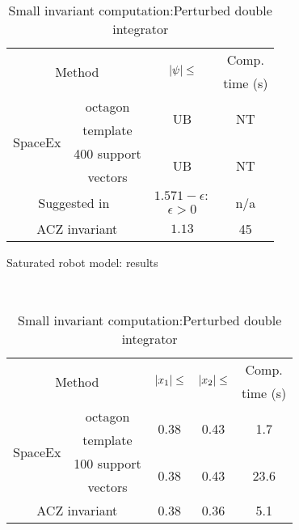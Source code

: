 {\begin{table}
\begin{minipage}{0.48\textwidth}
\begin{tabular}{|l|c|c|c|}
\hline
\multicolumn{2}{|c|}{\multirow{2}{*}{Method}} &
\multirow{2}{*}{$\left|\psi\right|\leq$} & Comp.\\
\multicolumn{2}{|c|}{} & & time (s)\\
\hline
\multirow{4}{*}{SpaceEx} & octagon & \multirow{2}{*}{UB} &
\multirow{2}{*}{NT}\\
& template & & \\
\cline{2-4}
& 400 support & \multirow{2}{*}{UB} & \multirow{2}{*}{NT}\\
& vectors & & \\
\hline
\multicolumn{2}{|c|}{\multirow{2}{*}{Suggested in~\cite{heinz2014benchmark}}} &
$1.571-\epsilon:$ & \multirow{2}{*}{n/a}\\
\multicolumn{2}{|c|}{} & $\epsilon>0$ &\\
\hline
\multicolumn{2}{|c|}{\multirow{2}{*}{ACZ invariant}} & \multirow{2}{*}{$1.13$} &
\multirow{2}{*}{45}\\
\multicolumn{2}{|c|}{} & &\\
\hline
\end{tabular}
\caption{Saturated robot model: results}
~\label{tab:robot-saturated}
\end{minipage}
\begin{minipage}{0.45\textwidth}
\begin{tabular}{|l|c|c|c|c|}
\hline
\multicolumn{2}{|c|}{\multirow{2}{*}{Method}} &
\multirow{2}{*}{$\left|x_1\right|\leq$} & \multirow{2}{*}{$\left|x_2\right|\leq$} & Comp.\\
\multicolumn{2}{|c|}{} & & & time (s) \\
\hline
\multirow{4}{*}{SpaceEx} & octagon & \multirow{2}{*}{0.38} &
\multirow{2}{*}{0.43} & \multirow{2}{*}{1.7}\\
& template & & &\\
\cline{2-5}
& 100 support & \multirow{2}{*}{0.38} & \multirow{2}{*}{0.43} & \multirow{2}{*}{23.6}\\
& vectors & & &\\
\hline
\multicolumn{2}{|c|}{\multirow{2}{*}{ACZ invariant}} &
\multirow{2}{*}{0.38} & \multirow{2}{*}{0.36} & 
\multirow{2}{*}{5.1}\\
\multicolumn{2}{|c|}{} & & &\\
\hline
\end{tabular}
\caption{Small invariant computation:\newline Perturbed double
  integrator}
~\label{tab:smallinv-pdi}
\vspace{1em}
\end{minipage}

\end{table}}
